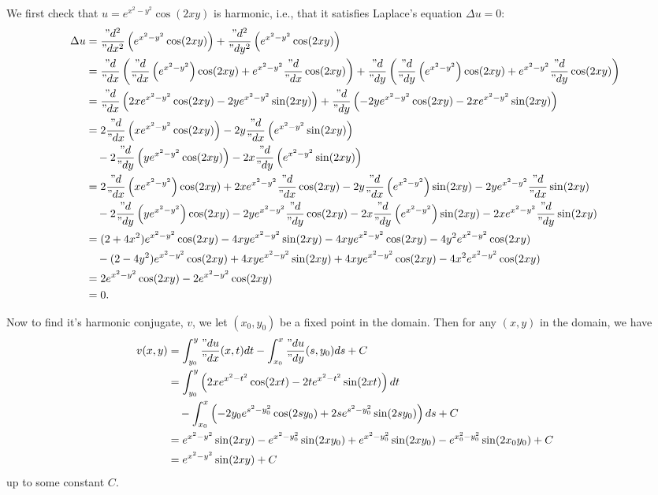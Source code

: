 \documentclass[12pt]{article}
\newcommand{\pd}[2]{\frac{"d#1}{"d#2}}
\newcommand{\pdn}[3]{\frac{"d^{#3}#1}{"d#2^{#3}}}
\begin{document}
We first check that $u=e^{x^2-y^2}\cos(2xy)$ is harmonic, i.e., that it satisfies Laplace's equation $\Delta u=0$:
\begin{align*}
    \Delta u 
        &= \pdn{}{x}{2}\left(e^{x^2-y^2}\cos(2xy)\right) + \pdn{}{y}{2}\left(e^{x^2-y^2}\cos(2xy)\right) \\
        &= \pd{}{x}\left(\pd{}{x}\left(e^{x^2-y^2}\right)\cos(2xy) + e^{x^2-y^2}\pd{}{x}\cos(2xy)\right) + \pd{}{y}\left(\pd{}{y}\left(e^{x^2-y^2}\right)\cos(2xy) + e^{x^2-y^2}\pd{}{y}\cos(2xy)\right) \\
        &= \pd{}{x}\left(2xe^{x^2-y^2}\cos(2xy) - 2ye^{x^2-y^2}\sin(2xy)\right) + \pd{}{y}\left(-2ye^{x^2-y^2}\cos(2xy) - 2xe^{x^2-y^2}\sin(2xy)\right) \\
        &= 2\pd{}{x}\left(xe^{x^2-y^2}\cos(2xy)\right) - 2y\pd{}{x}\left(e^{x^2-y^2}\sin(2xy)\right) \\
        &\quad - 2\pd{}{y}\left(ye^{x^2-y^2}\cos(2xy)\right) - 2x\pd{}{y}\left(e^{x^2-y^2}\sin(2xy)\right) \\
        &= 2\pd{}{x}\left(xe^{x^2-y^2}\right)\cos(2xy) + 2xe^{x^2-y^2}\pd{}{x}\cos(2xy) - 2y\pd{}{x}\left(e^{x^2-y^2}\right)\sin(2xy) - 2ye^{x^2-y^2}\pd{}{x}\sin(2xy) \\
        &\quad - 2\pd{}{y}\left(ye^{x^2-y^2}\right)\cos(2xy) - 2ye^{x^2-y^2}\pd{}{y}\cos(2xy) - 2x\pd{}{y}\left(e^{x^2-y^2}\right)\sin(2xy) - 2xe^{x^2-y^2}\pd{}{y}\sin(2xy) \\
        &= (2 + 4x^2)e^{x^2-y^2}\cos(2xy) - 4xye^{x^2-y^2}\sin(2xy) - 4xye^{x^2-y^2}\cos(2xy) - 4y^2e^{x^2-y^2}\cos(2xy) \\
        &\quad - (2 - 4y^2)e^{x^2-y^2}\cos(2xy) + 4xye^{x^2-y^2}\sin(2xy) + 4xye^{x^2-y^2}\cos(2xy) - 4x^2e^{x^2-y^2}\cos(2xy) \\
        &= 2e^{x^2-y^2}\cos(2xy) - 2e^{x^2-y^2}\cos(2xy) \\
        &= 0.
\end{align*}

Now to find it's harmonic conjugate, $v$, we let $(x_0,y_0)$ be a fixed point in the domain. Then for any $(x,y)$ in the domain, we have
\begin{align*}
    v(x,y)
        &= \int_{y_0}^y\pd ux (x,t) dt - \int_{x_0}^x\pd uy (s,y_0)ds + C \\
        &= \int_{y_0}^y\left(2xe^{x^2-t^2}\cos(2xt) - 2te^{x^2-t^2}\sin(2xt)\right) dt \\
        &\quad - \int_{x_0}^x\left(-2y_0e^{s^2-y_0^2}\cos(2sy_0) + 2se^{s^2-y_0^2}\sin(2sy_0)\right)ds + C \\
        &= e^{x^2-y^2}\sin(2xy) - e^{x^2-y_0^2}\sin(2xy_0) + e^{x^2-y_0^2}\sin(2xy_0) - e^{x_0^2-y_0^2}\sin(2x_0y_0) + C \\
        &= e^{x^2-y^2}\sin(2xy) + C
\end{align*}
up to some constant $C$.
\end{document}
